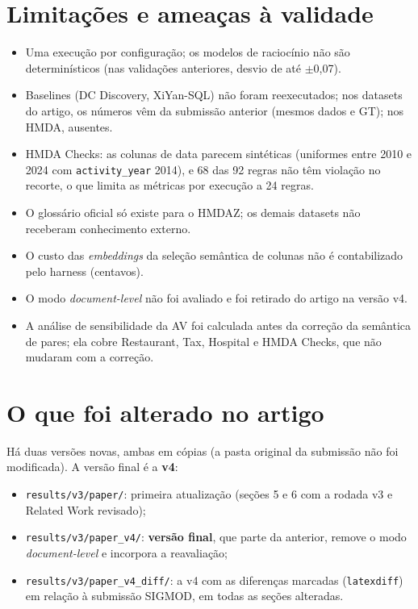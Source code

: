\documentclass[11pt,a4paper]{article}
\begin{document}
\section{Limitações e ameaças à validade}
\begin{itemize}
  \item Uma execução por configuração; os modelos de raciocínio não são determinísticos (nas validações
        anteriores, desvio de até $\pm$0,07).
  \item Baselines (DC Discovery, XiYan-SQL) não foram reexecutados; nos datasets do artigo, os números vêm da
        submissão anterior (mesmos dados e GT); nos HMDA, ausentes.
  \item HMDA Checks: as colunas de data parecem sintéticas (uniformes entre 2010 e 2024 com \texttt{activity\_year}
        2014), e 68 das 92 regras não têm violação no recorte, o que limita as métricas por execução a 24 regras.
  \item O glossário oficial só existe para o HMDAZ; os demais datasets não receberam conhecimento externo.
  \item O custo das \emph{embeddings} da seleção semântica de colunas não é contabilizado pelo harness
        (centavos).
  \item O modo \emph{document-level} não foi avaliado e foi retirado do artigo na versão v4.
  \item A análise de sensibilidade da AV foi calculada antes da correção da semântica de pares; ela cobre
        Restaurant, Tax, Hospital e HMDA Checks, que não mudaram com a correção.
\end{itemize}

\section{O que foi alterado no artigo}

Há duas versões novas, ambas em cópias (a pasta original da submissão não foi modificada). A versão final é a
\textbf{v4}:
\begin{itemize}
  \item \texttt{results/v3/paper/}: primeira atualização (seções 5 e 6 com a rodada v3 e Related Work revisado);
  \item \texttt{results/v3/paper\_v4/}: \textbf{versão final}, que parte da anterior, remove o modo
        \emph{document-level} e incorpora a reavaliação;
  \item \texttt{results/v3/paper\_v4\_diff/}: a v4 com as diferenças marcadas (\texttt{latexdiff}) em relação à
        submissão SIGMOD, em todas as seções alteradas.
\end{itemize}
\end{document}
